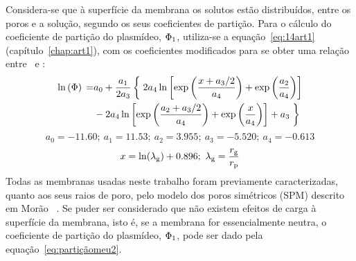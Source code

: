 Considera-se que à superfície da membrana os solutos estão distribuídos, entre os poros e a solução, segundo os seus coeficientes de partição. Para o cálculo do coeficiente de partição do plasmídeo, $\Phi_{1}$, utiliza-se a equação~\ref{eq:14art1} (capítulo~\ref{chap:art1}), com os coeficientes modificados para se obter uma relação entre \particao\ e \lambdag:
%
%
%
%
\begin{equation}
\label{eq:partiçãomeu2}
\begin{split}
\ln \left(\particao\right){}=&a_{0}+\frac{a_{1}}{2a_{3}}\left\{\vphantom{\frac{x+a_{3}/2}{a_{4}}}\right.2a_{4}\ln \left[\exp \left(\frac{x+a_{3}/2}{a_{4}}\right)+\exp \left(\frac{a_{2}}{a_{4}}\right)\right] \\
& -2a_{4}\ln \left[\exp\left(\frac{a_{2}+a_{3}/2}{a_{4}}\right)+\exp \left(\frac{x}{a_{4}}\right)\right]+a_{3}\left.\vphantom{\frac{x+a_{3}/2}{a_{4}}}\right\}
\end{split}
\end{equation}
\begin{displaymath}
a_{0}=-11.60;\ a_{1}=11.53;\ a_{2}=3.955;\ a_{3}=-5.520;\ a_{4}=-0.613
\end{displaymath}
\begin{displaymath}
x=\ln (\lambdag)+0.896;\ \lambdag=\frac{\raiogiracao}{\raioporo}
\end{displaymath}
Todas as membranas usadas neste trabalho foram previamente caracterizadas, quanto aos seus raios de poro, pelo modelo dos poros simétricos (SPM) descrito em Morão \et\ \cite{moraompa}.
%
Se puder ser considerado que não existem efeitos de carga à superfície da membrana, isto é, se a membrana for essencialmente neutra, o coeficiente de partição do plasmídeo, $\Phi_{1}$, pode ser dado pela equação~\ref{eq:partiçãomeu2}.

